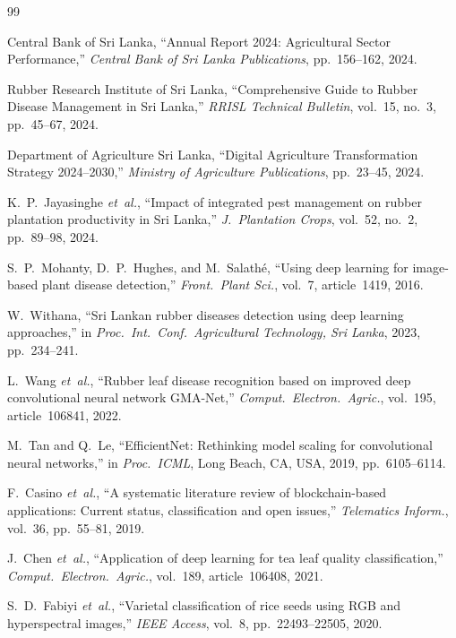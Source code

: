 \documentclass[10pt, conference]{IEEEtran}
\begin{document}
\begin{thebibliography}{99}

Central Bank of Sri Lanka, ``Annual Report 2024: Agricultural Sector
Performance,'' \textit{Central Bank of Sri Lanka Publications},
pp.~156--162, 2024.

Rubber Research Institute of Sri Lanka, ``Comprehensive Guide to Rubber
Disease Management in Sri Lanka,'' \textit{RRISL Technical Bulletin},
vol.~15, no.~3, pp.~45--67, 2024.

Department of Agriculture Sri Lanka, ``Digital Agriculture
Transformation Strategy 2024--2030,'' \textit{Ministry of Agriculture
Publications}, pp.~23--45, 2024.

K.~P.~Jayasinghe \textit{et~al.}, ``Impact of integrated pest management
on rubber plantation productivity in Sri Lanka,'' \textit{J.\ Plantation
Crops}, vol.~52, no.~2, pp.~89--98, 2024.

S.~P.~Mohanty, D.~P.~Hughes, and M.~Salath\'{e}, ``Using deep learning
for image-based plant disease detection,'' \textit{Front.\ Plant Sci.},
vol.~7, article~1419, 2016.

W.~Withana, ``Sri Lankan rubber diseases detection using deep learning
approaches,'' in \textit{Proc.\ Int.\ Conf.\ Agricultural Technology,
Sri Lanka}, 2023, pp.~234--241.

L.~Wang \textit{et~al.}, ``Rubber leaf disease recognition based on
improved deep convolutional neural network GMA-Net,''
\textit{Comput.\ Electron.\ Agric.}, vol.~195, article~106841, 2022.

M.~Tan and Q.~Le, ``EfficientNet: Rethinking model scaling for
convolutional neural networks,'' in \textit{Proc.\ ICML}, Long Beach,
CA, USA, 2019, pp.~6105--6114.

F.~Casino \textit{et~al.}, ``A systematic literature review of
blockchain-based applications: Current status, classification and
open issues,'' \textit{Telematics Inform.}, vol.~36, pp.~55--81, 2019.

J.~Chen \textit{et~al.}, ``Application of deep learning for tea leaf
quality classification,'' \textit{Comput.\ Electron.\ Agric.},
vol.~189, article~106408, 2021.

S.~D.~Fabiyi \textit{et~al.}, ``Varietal classification of rice seeds
using RGB and hyperspectral images,'' \textit{IEEE Access}, vol.~8,
pp.~22493--22505, 2020.


\end{thebibliography}
\end{document}
